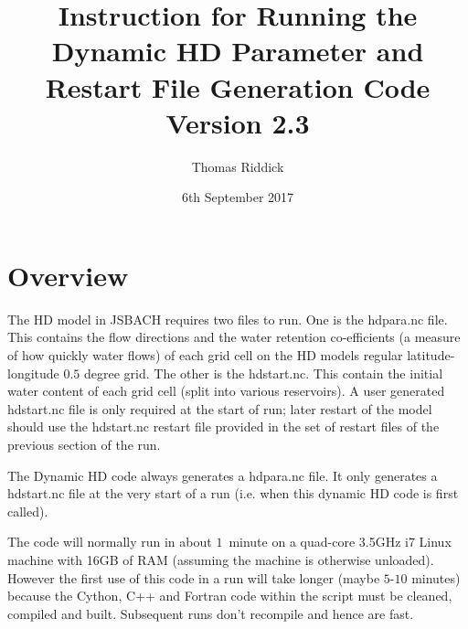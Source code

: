 \documentclass{article}
\title{Instruction for Running the Dynamic HD Parameter and Restart File Generation Code Version 2.3}
\author{Thomas Riddick}
\date{6th September 2017}
\begin{document}
\lstset{language=bash}
\maketitle
\section{Overview}
The HD model in JSBACH requires two files to run. One is the hdpara.nc file. This contains the flow directions and the water retention co-efficients (a measure of how quickly water flows) of each grid cell on the HD models regular latitude-longitude $0.5$ degree grid. The other is the hdstart.nc. This contain the initial water content of each grid cell (split into various reservoirs). A user generated hdstart.nc file is only required at the start of run; later restart of the model should use the hdstart.nc restart file provided in the set of restart files of the previous section of the run. 

The Dynamic HD code always generates a hdpara.nc file. It only generates a hdstart.nc file at the very start of a run (i.e. when this dynamic HD code is first called). 

The code will normally run in about $1$~minute on a quad-core  3.5GHz i7 Linux machine with 16GB of RAM (assuming the machine is otherwise unloaded). However the first use of this code in a run will take longer (maybe $5$-$10$ minutes) because the Cython, C++ and Fortran code within the script must be cleaned, compiled and built. Subsequent runs don't recompile and hence are fast. 
\end{document}

